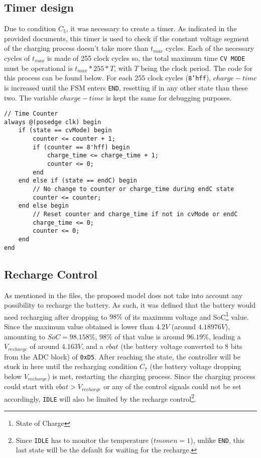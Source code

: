 \documentclass[12pt]{article}
\begin{document}
\subsection{Timer design}

Due to condition $C_5$, it was necessary to create a timer. As indicated in the provided documents, this timer is used to check if the constant voltage segment of the charging process doesn't take more than $t_{max}$ cycles. Each of the necessary cycles of $t_{max}$ is made of 255 clock cycles so, the total maximum time \texttt{CV MODE} must be operational is $t_{max}*255*T$, with $T$ being the clock period. The code for this process can be found below. For each 255 clock cycles (\texttt{8'hff}), $charge-time$ is increased until the FSM enters \texttt{END}, resetting if in any other state than these two. The variable $charge-time$ is kept the same for debugging purposes.

\begin{lstlisting}[style=verilog, caption={Time Counter Logic}, label={lst:time_counter}]
// Time Counter
always @(posedge clk) begin
    if (state == cvMode) begin
        counter <= counter + 1;
        if (counter == 8'hff) begin 
            charge_time <= charge_time + 1;
            counter <= 0;
        end
    end else if (state == endC) begin
        // No change to counter or charge_time during endC state
        counter <= counter;
    end else begin
        // Reset counter and charge_time if not in cvMode or endC
        charge_time <= 0;
        counter <= 0;
    end
end
\end{lstlisting}


\subsection{Recharge Control}

As mentioned in the files, the proposed model does not take into account any possibility to recharge the battery. As such, it was defined that the battery would need recharging after dropping to $98\%$ of its maximum voltage and SoC\footnote{State of Charge}\cite{BARAI201599} value. Since the maximum value obtained is lower than $4.2V$ (around $4.18976V$), amounting to $SoC=98.158\%$, $98\%$ of that value is around $96.19\%$, leading a $V_{recharge}$ of around $4.163V$, and a $vbat$ (the battery voltage converted to 8 bits from the ADC block) of \texttt{0xD5}. After reaching the  state, the controller will be stuck in here until the recharging condition $C_7$ (the battery voltage dropping below $V_{recharge}$) is met, restarting the charging process. Since the charging process could start with $vbat>V_{recharge}$ or any of the control signals could not be set accordingly, \texttt{IDLE} will also be limited by the recharge control\footnote{Since \texttt{IDLE} has to monitor the temperature ($tmonen=1$), unlike \texttt{END}, this last state will be the default for waiting for the recharge.}.
\end{document}
